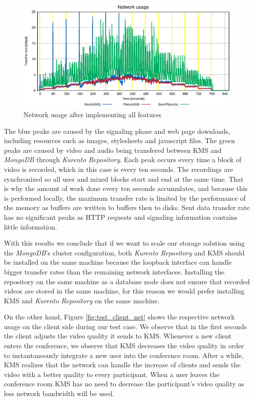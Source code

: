 \documentclass[conference,compsoc,a4paper]{IEEEtran}
\begin{document}
\begin{figure}
  \centering
  \includegraphics[width=\linewidth]{stats/test_full_features_net.eps}
  \caption{Network usage after implementing all features}
  \label{fig:test_full_features_net}
\end{figure}


      The blue peaks are caused by the signaling phase and web page downloads, including resources such as images, stylesheets and javascript files. 
      The green peaks are caused by video and audio being transfered between \gls{KMS} and \emph{MongoDB} through \emph{Kurento Repository}. Each peak occurs every time a block of video is recorded, which in this case is every ten seconds. 
      The recordings are synchronized so all user and mixed blocks start and end at the same time. That is why the amount of work done every ten seconds accumulates, and because this is performed locally, the maximum transfer rate is limited by the performance of the memory as buffers are written to buffers then to disks. 
      Sent data transfer rate has no significant peaks as \gls{HTTP} requests and signaling information contains little information.

	With this results we conclude that if we want to scale our storage solution using the \emph{MongoDB}'s cluster configuration, both \emph{Kurento Repository} and \gls{KMS} should be installed on the same machine because the loopback interface can handle bigger transfer rates than the remaining network interfaces. Installing the repository on the same machine as a database node does not ensure that recorded videos are stored in the same machine, for this reason we would prefer installing \gls{KMS} and \emph{Kurento Repository} on the same machine.





On the other hand, Figure \ref{fig:test_client_net} shows the respective network usage on the client side during our test case. We observe that in the first seconds the client adjusts the video quality it sends to \gls{KMS}. Whenever a new client enters the conference, we observe that \gls{KMS} decreases the video quality in order to instantaneously integrate a new user into the conference room. After a while, \gls{KMS} realizes that the network can handle the increase of clients and sends the video with a better quality to every participant. When a user leaves the conference room \gls{KMS} has no need to decrease the participant's video quality as less network bandwidth will be used.
\end{document}
